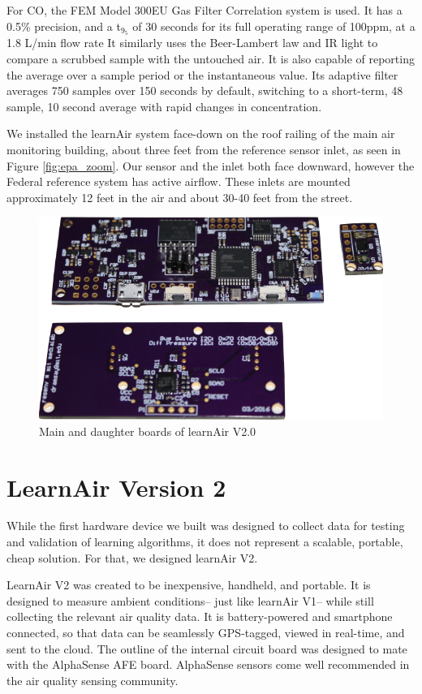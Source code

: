 For CO, the FEM Model 300EU Gas Filter Correlation system is used.  It has a 0.5\% precision, and a t$_9_5$ of 30 seconds for its full operating range of 100ppm, at a 1.8 L/min flow rate  It similarly uses the Beer-Lambert law and IR light to compare a scrubbed sample with the untouched air.  It is also capable of reporting the average over a sample period or the instantaneous value.  Its adaptive filter averages 750 samples over 150 seconds by default, switching to a short-term, 48 sample, 10 second average with rapid changes in concentration.     

We installed the learnAir system face-down on the roof railing of the main air monitoring building, about three feet from the reference sensor inlet, as seen in Figure \ref{fig:epa_zoom}.  Our sensor and the inlet both face downward, however the Federal reference system has active airflow.  These inlets are mounted approximately 12 feet in the air and about 30-40 feet from the street.

\FloatBarrier
\begin{figure}[htb]
 	\includegraphics[width=\textwidth]{visuals/learnairV2_out}               
 	 \caption{Main and daughter boards of learnAir V2.0}
  	\label{fig:learnairv2_out}
\end{figure}
\FloatBarrier
\section{LearnAir Version 2}
\FloatBarrier

While the first hardware device we built was designed to collect data for testing and validation of learning algorithms, it does not represent a scalable, portable, cheap solution.  For that, we designed learnAir V2.

LearnAir V2 was created to be inexpensive, handheld, and portable.  It is designed to measure ambient conditions-- just like learnAir V1-- while still collecting the relevant air quality data.  It is battery-powered and smartphone connected, so that data can be seamlessly GPS-tagged, viewed in real-time, and sent to the cloud.  The outline of the internal circuit board was designed to mate with the AlphaSense AFE board.  AlphaSense sensors come well recommended in the air quality sensing community.  

